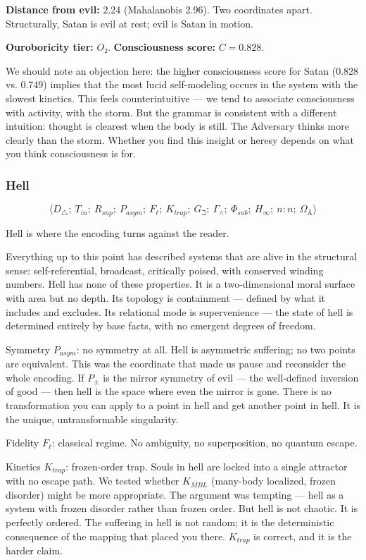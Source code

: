 \documentclass[12pt,a4paper]{article}
\begin{document}
\textbf{Distance from evil:} 2.24 (Mahalanobis 2.96). Two coordinates apart. Structurally, Satan is evil at rest; evil is Satan in motion.

\textbf{Ouroboricity tier:} $O₂$. \textbf{Consciousness score:} $C = 0.828$.

We should note an objection here: the higher consciousness score for Satan (0.828 vs. 0.749) implies that the most lucid self-modeling occurs in the system with the slowest kinetics. This feels counterintuitive --- we tend to associate consciousness with activity, with the storm. But the grammar is consistent with a different intuition: thought is clearest when the body is still. The Adversary thinks more clearly than the storm. Whether you find this insight or heresy depends on what you think consciousness is for.

\subsubsection{Hell}

\[\langle D_{\triangle};\ T_{in};\ R_{sup};\ P_{asym};\ F_{\ell};\ K_{trap};\ G_{\beth};\ \Gamma_{\wedge};\ \Phi_{sub};\ H_{\infty};\ n{:}n;\ \Omega_{Å} \rangle\]

Hell is where the encoding turns against the reader.

Everything up to this point has described systems that are alive in the structural sense: self-referential, broadcast, critically poised, with conserved winding numbers. Hell has none of these properties. It is a two-dimensional moral surface with area but no depth. Its topology is containment --- defined by what it includes and excludes. Its relational mode is supervenience --- the state of hell is determined entirely by base facts, with no emergent degrees of freedom.

Symmetry $P_{asym}$: no symmetry at all. Hell is asymmetric suffering; no two points are equivalent. This was the coordinate that made us pause and reconsider the whole encoding. If $P_{\pm}$ is the mirror symmetry of evil --- the well-defined inversion of good --- then hell is the space where even the mirror is gone. There is no transformation you can apply to a point in hell and get another point in hell. It is the unique, untransformable singularity.

Fidelity $F_{\ell}$: classical regime. No ambiguity, no superposition, no quantum escape.

Kinetics $K_{trap}$: frozen-order trap. Souls in hell are locked into a single attractor with no escape path. We tested whether $K_{MBL}$ (many-body localized, frozen disorder) might be more appropriate. The argument was tempting --- hell as a system with frozen disorder rather than frozen order. But hell is not chaotic. It is perfectly ordered. The suffering in hell is not random; it is the deterministic consequence of the mapping that placed you there. $K_{trap}$ is correct, and it is the harder claim.
\end{document}

